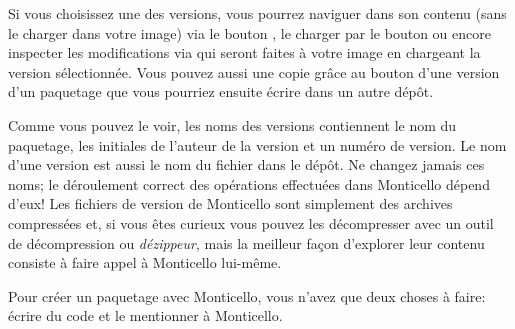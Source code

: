 \documentclass[a4paper,10pt,twoside]{book}
\begin{document}
Si vous choisissez une des versions, vous pourrez naviguer dans son contenu (sans le charger dans votre image) via le bouton , le charger
par le bouton  ou encore inspecter les modifications
via  qui seront faites \`a votre image en chargeant la version
s\'electionn\'ee. Vous pouvez aussi une copie gr\^ace au bouton 
d'une version d'un paquetage que vous pourriez ensuite \'ecrire dans un
autre d\'ep\^ot.

Comme vous pouvez le voir, les noms des versions contiennent le nom du paquetage, les initiales de l'auteur de la version et un num\'ero de version.
Le nom d'une version est aussi le nom du fichier dans le d\'ep\^ot. Ne
changez jamais ces noms; le d\'eroulement correct des op\'erations
effectu\'ees dans Monticello d\'epend d'eux!
Les fichiers de version de Monticello sont simplement des archives compress\'ees
 et, si vous \^etes curieux vous pouvez les d\'ecompresser avec un outil 
de d\'ecompression ou \emph{d\'ezippeur}, mais la meilleur fa\c{c}on 
d'explorer leur contenu consiste \`a faire appel \`a Monticello lui-m\^eme.

Pour cr\'eer un paquetage avec Monticello, vous n'avez que deux choses \`a faire:
\'ecrire du code et le mentionner \`a Monticello.

\end{document}
